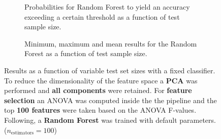 \begin{figure}
    \captionsetup[subfigure]{justification=justified,singlelinecheck=false}
    \begin{subfigure}[t]{0.61\textwidth}
        
        \caption{Probabilities for Random Forest to yield an accuracy exceeding a certain threshold as a function of test sample size.}
    \end{subfigure}
    \hspace{3.0mm}
    \begin{subfigure}[t]{0.34\textwidth}
        
        \caption{Minimum, maximum and mean results for the Random Forest as a function of test sample size.}
    \end{subfigure}
    \caption[Effects of varying test sample size. Random Forest; Preprocessing: PCA ($n_\text{components} = \text{all}$); ANOVA feature selection ($k_\text{best} = \num{100}$)]{Results as a function of variable test set sizes with a fixed classifier. To reduce the dimensionality of the feature space a \textbf{PCA} was performed and \textbf{all components} were retained. For \textbf{feature selection} an ANOVA was computed inside the the pipeline and the top \textbf{\num{100} features} were taken based on the ANOVA F-values. Following, a \textbf{{Random Forest}} was trained with default parameters. ($n_\text{estimators}=\num{100}$)}
    \label{fig:PCA_all_components_100_best_selected_RandomForest}
\end{figure}

